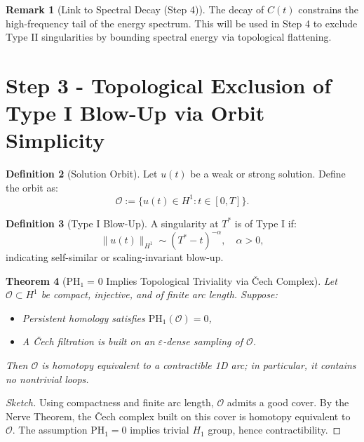 \documentclass[11pt]{article}
\newtheorem{theorem}{Theorem}[section]
\theoremstyle{definition}
\newtheorem{definition}[theorem]{Definition}
\newtheorem{remark}[theorem]{Remark}
\begin{document}
\begin{remark}[Link to Spectral Decay (Step 4)]
The decay of $C(t)$ constrains the high-frequency tail of the energy spectrum. This will be used in Step 4 to exclude Type II singularities by bounding spectral energy via topological flattening.
\end{remark}



\section{Step 3 - Topological Exclusion of Type I Blow-Up via Orbit Simplicity}

\begin{definition}[Solution Orbit]
Let $u(t)$ be a weak or strong solution. Define the orbit as:
\[
\mathcal{O} := \{u(t) \in H^1 : t \in [0,T]\}.
\]
\end{definition}

\begin{definition}[Type I Blow-Up]
A singularity at $T^*$ is of Type I if:
\[
\|u(t)\|_{H^1} \sim (T^* - t)^{-\alpha}, \quad \alpha > 0,
\]
indicating self-similar or scaling-invariant blow-up.
\end{definition}

\begin{theorem}[PH₁ = 0 Implies Topological Triviality via Čech Complex]
\label{thm:cech-triviality}
Let $\mathcal{O} \subset H^1$ be compact, injective, and of finite arc length. Suppose:
\begin{itemize}
  \item Persistent homology satisfies $\mathrm{PH}_1(\mathcal{O}) = 0$,
  \item A Čech filtration is built on an $\varepsilon$-dense sampling of $\mathcal{O}$.
\end{itemize}
Then $\mathcal{O}$ is homotopy equivalent to a contractible 1D arc; in particular, it contains no nontrivial loops.
\end{theorem}

\begin{proof}[Sketch]
Using compactness and finite arc length, $\mathcal{O}$ admits a good cover. By the Nerve Theorem, the Čech complex built on this cover is homotopy equivalent to $\mathcal{O}$. The assumption $\mathrm{PH}_1 = 0$ implies trivial $H_1$ group, hence contractibility.
\end{proof}
\end{document}
